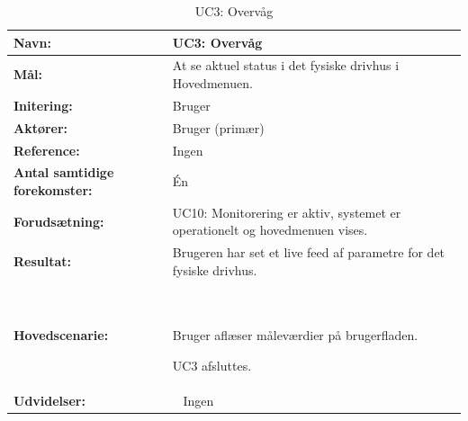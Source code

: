 \begin{table}[h]
\begin{tabularx}{\textwidth}{| >{\raggedright\arraybackslash}p{3.3 cm} | >{\raggedright\arraybackslash}X |} \hline

\textbf{Navn:} 						& UC3: Overvåg\\ \hline
\textbf{Mål:}						& At se aktuel status i det fysiske drivhus i Hovedmenuen. \\ \hline
\textbf{Initering:}					& Bruger \\ \hline
\textbf{Aktører:} 					& Bruger (primær) \\ \hline
\textbf{Reference:} 					& Ingen \\ \hline
\textbf{Antal samtidige forekomster:} & Én \\ \hline
\textbf{Forudsætning:} 				& UC10: Monitorering er aktiv, systemet er operationelt og hovedmenuen vises. \\ \hline
\textbf{Resultat:}					& Brugeren har set et live feed af parametre for det fysiske drivhus. \\ \hline
\textbf{Hovedscenarie:}				& ~

\begin{packed_enum}
\item Bruger aflæser måleværdier på brugerfladen.
\item UC3 afsluttes.
\end{packed_enum} \\ \hline
\textbf{Udvidelser:}				& ~
Ingen \\ \hline
\end{tabularx}

\clearpage

\caption{UC3: Overvåg}
\label{tbl:UC3}
\end{table}

